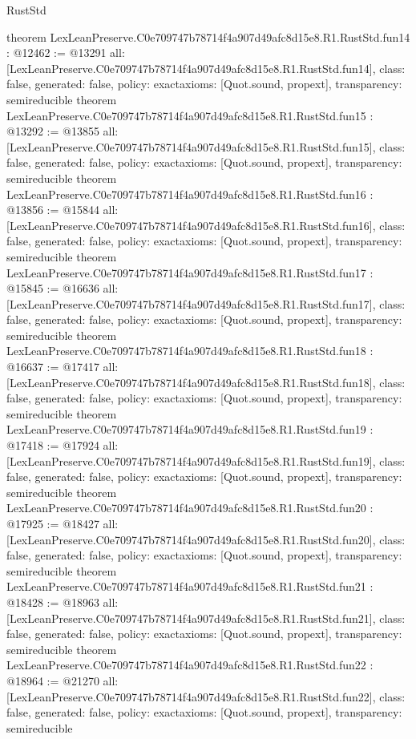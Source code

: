 \begin{lexlean}{RustStd}
\begin{coremodule}
{}
theorem LexLeanPreserve.C0e709747b78714f4a907d49afc8d15e8.R1.RustStd.fun14 : @12462 := @13291 {
  all: [LexLeanPreserve.C0e709747b78714f4a907d49afc8d15e8.R1.RustStd.fun14],
  class: false,
  generated: false,
  policy: exact{axioms: [Quot.sound, propext]},
  transparency: semireducible
}
theorem LexLeanPreserve.C0e709747b78714f4a907d49afc8d15e8.R1.RustStd.fun15 : @13292 := @13855 {
  all: [LexLeanPreserve.C0e709747b78714f4a907d49afc8d15e8.R1.RustStd.fun15],
  class: false,
  generated: false,
  policy: exact{axioms: [Quot.sound, propext]},
  transparency: semireducible
}
theorem LexLeanPreserve.C0e709747b78714f4a907d49afc8d15e8.R1.RustStd.fun16 : @13856 := @15844 {
  all: [LexLeanPreserve.C0e709747b78714f4a907d49afc8d15e8.R1.RustStd.fun16],
  class: false,
  generated: false,
  policy: exact{axioms: [Quot.sound, propext]},
  transparency: semireducible
}
theorem LexLeanPreserve.C0e709747b78714f4a907d49afc8d15e8.R1.RustStd.fun17 : @15845 := @16636 {
  all: [LexLeanPreserve.C0e709747b78714f4a907d49afc8d15e8.R1.RustStd.fun17],
  class: false,
  generated: false,
  policy: exact{axioms: [Quot.sound, propext]},
  transparency: semireducible
}
theorem LexLeanPreserve.C0e709747b78714f4a907d49afc8d15e8.R1.RustStd.fun18 : @16637 := @17417 {
  all: [LexLeanPreserve.C0e709747b78714f4a907d49afc8d15e8.R1.RustStd.fun18],
  class: false,
  generated: false,
  policy: exact{axioms: [Quot.sound, propext]},
  transparency: semireducible
}
theorem LexLeanPreserve.C0e709747b78714f4a907d49afc8d15e8.R1.RustStd.fun19 : @17418 := @17924 {
  all: [LexLeanPreserve.C0e709747b78714f4a907d49afc8d15e8.R1.RustStd.fun19],
  class: false,
  generated: false,
  policy: exact{axioms: [Quot.sound, propext]},
  transparency: semireducible
}
theorem LexLeanPreserve.C0e709747b78714f4a907d49afc8d15e8.R1.RustStd.fun20 : @17925 := @18427 {
  all: [LexLeanPreserve.C0e709747b78714f4a907d49afc8d15e8.R1.RustStd.fun20],
  class: false,
  generated: false,
  policy: exact{axioms: [Quot.sound, propext]},
  transparency: semireducible
}
theorem LexLeanPreserve.C0e709747b78714f4a907d49afc8d15e8.R1.RustStd.fun21 : @18428 := @18963 {
  all: [LexLeanPreserve.C0e709747b78714f4a907d49afc8d15e8.R1.RustStd.fun21],
  class: false,
  generated: false,
  policy: exact{axioms: [Quot.sound, propext]},
  transparency: semireducible
}
theorem LexLeanPreserve.C0e709747b78714f4a907d49afc8d15e8.R1.RustStd.fun22 : @18964 := @21270 {
  all: [LexLeanPreserve.C0e709747b78714f4a907d49afc8d15e8.R1.RustStd.fun22],
  class: false,
  generated: false,
  policy: exact{axioms: [Quot.sound, propext]},
  transparency: semireducible
}
\end{coremodule}
\end{lexlean}

